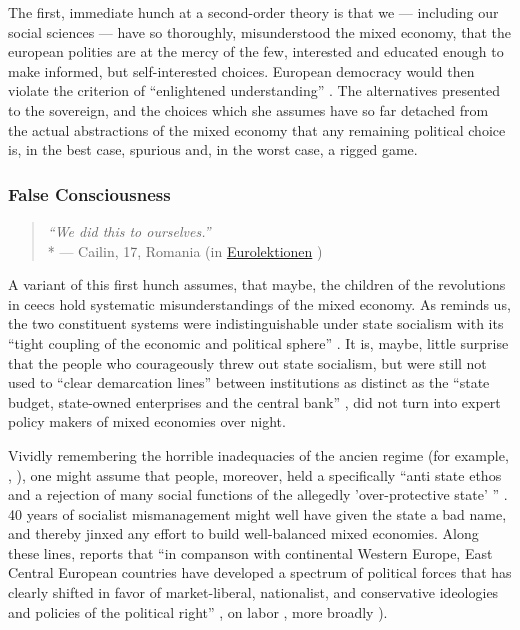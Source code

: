The first, immediate hunch at a second-order theory is that we --- including our social sciences --- have so thoroughly, misunderstood the mixed economy, that the european polities are at the mercy of the few, interested and educated enough to make informed, but self-interested choices.
European democracy would then violate the criterion of ``enlightened understanding'' \citep{Dahl-1989-aa}.
The alternatives presented to the sovereign, and the choices which she assumes have so far detached from the actual abstractions of the mixed economy that any remaining political choice is, in the best case, spurious and, in the worst case, a rigged game.

\subsubsection[False Consciousness]{False Consciousness}

\begin{quote}
	\emph{``We did this to ourselves.''}
	\\*
	--- Cailin, 17, Romania (in \href{http://eurolektionen.de}{Eurolektionen} \citeyear{DeRuffray2010})
\end{quote}

A variant of this first hunch assumes, that maybe, the children of the revolutions in \glspl{ceec} hold systematic misunderstandings of the mixed economy.
As \citeauthor{Bonker2006} reminds us, the two constituent systems were indistinguishable under state socialism with its ``tight coupling of the economic and political sphere'' \citeyearpar[35]{Bonker2006}.
It is, maybe, little surprise that the people who courageously threw out state socialism, but were still not used to ``clear demarcation lines'' between institutions as distinct as the ``state budget, state-owned enterprises and the central bank'' \citeyearpar[36]{Bonker2006}, did not turn into expert policy makers of mixed economies over night.

Vividly remembering the horrible inadequacies of the ancien regime (for example, \citealt{Szikra2009}, \citealt{Millard1992}), one might assume that people, moreover, held a specifically  ``anti state ethos and a rejection of many social functions of the allegedly 'over-protective state' '' \citeyearpar[130]{Millard1992}.
40 years of socialist mismanagement might well have given the state a bad name, and thereby jinxed any effort to build well-balanced mixed economies.
Along these lines, \citeauthor{Inglot2008} reports that ``in companson with continental Western Europe, East Central European countries have developed a spectrum of political forces that has clearly shifted in favor of market-liberal, nationalist, and conservative ideologies and policies of the political right'' \citeyearpar[212]{Inglot2008}, on labor \citealt{Crowley2002}, more broadly \citealt{OrenOuto2001}).

